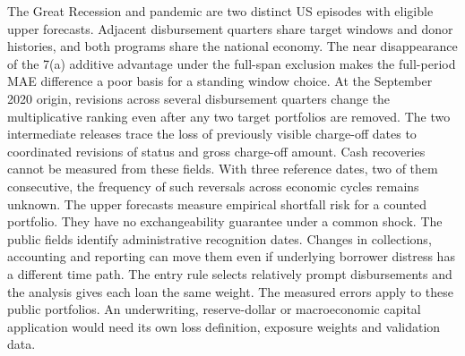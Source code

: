 The Great Recession and pandemic are two distinct US episodes with eligible upper forecasts. Adjacent disbursement quarters share target windows and donor histories, and both programs share the national economy. The near disappearance of the 7(a) additive advantage under the full-span exclusion makes the full-period MAE difference a poor basis for a standing window choice. At the September 2020 origin, revisions across several disbursement quarters change the multiplicative ranking even after any two target portfolios are removed. The two intermediate releases trace the loss of previously visible charge-off dates to coordinated revisions of status and gross charge-off amount. Cash recoveries cannot be measured from these fields. With three reference dates, two of them consecutive, the frequency of such reversals across economic cycles remains unknown. The upper forecasts measure empirical shortfall risk for a counted portfolio. They have no exchangeability guarantee under a common shock. The public fields identify administrative recognition dates. Changes in collections, accounting and reporting can move them even if underlying borrower distress has a different time path. The entry rule selects relatively prompt disbursements and the analysis gives each loan the same weight. The measured errors apply to these public portfolios. An underwriting, reserve-dollar or macroeconomic capital application would need its own loss definition, exposure weights and validation data.
